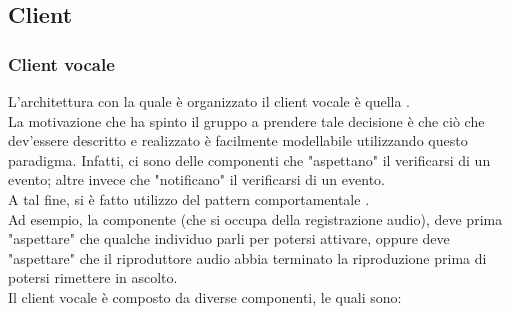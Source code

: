\subsection{Client}
\subsubsection{Client vocale}
L'architettura con la quale è organizzato il client vocale è quella .\\
La motivazione che ha spinto il gruppo a prendere tale decisione è che ciò che dev'essere descritto e realizzato è facilmente modellabile utilizzando questo paradigma. Infatti, ci sono delle componenti che "aspettano" il verificarsi di un evento; altre invece che "notificano"  il verificarsi di un evento.\\
A tal fine, si è fatto utilizzo del pattern comportamentale .\\
Ad esempio, la componente  (che si occupa della registrazione audio), deve prima "aspettare" che qualche individuo parli per potersi attivare, oppure deve "aspettare" che il riproduttore audio abbia terminato la riproduzione prima di potersi rimettere in ascolto.\\
Il client vocale è composto da diverse componenti, le quali sono:
